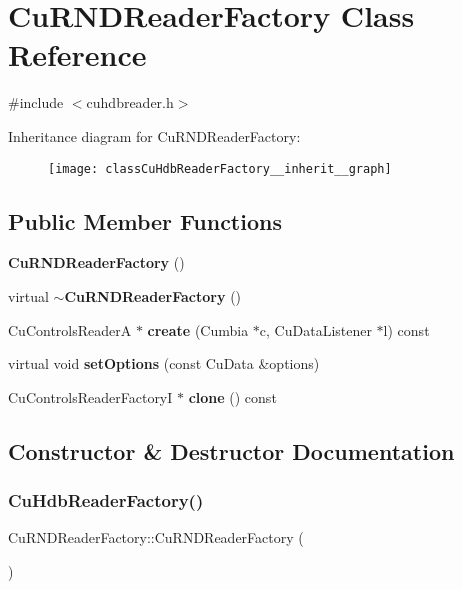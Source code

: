 \section{Cu\+R\+N\+D\+Reader\+Factory Class Reference}
\label{classCuHdbReaderFactory}


{\ttfamily \#include $<$cuhdbreader.\+h$>$}



Inheritance diagram for Cu\+R\+N\+D\+Reader\+Factory\+:
\nopagebreak
\begin{figure}[H]
\begin{center}
\leavevmode
\texttt{[image: classCuHdbReaderFactory\_\_inherit\_\_graph]}
\end{center}
\end{figure}
\subsection*{Public Member Functions}
\begin{DoxyCompactItemize}
\item 
\textbf{ Cu\+R\+N\+D\+Reader\+Factory} ()
\item 
virtual \textbf{ $\sim$\+Cu\+R\+N\+D\+Reader\+Factory} ()
\item 
Cu\+Controls\+ReaderA $\ast$ \textbf{ create} (Cumbia $\ast$c, Cu\+Data\+Listener $\ast$l) const
\item 
virtual void \textbf{ set\+Options} (const Cu\+Data \&options)
\item 
Cu\+Controls\+Reader\+FactoryI $\ast$ \textbf{ clone} () const
\end{DoxyCompactItemize}


\subsection{Constructor \& Destructor Documentation}
\mbox{\label{classCuHdbReaderFactory_aba50f374fd1cefe8d06e48dd94d477f5}} 
\subsubsection{CuHdbReaderFactory()}
{\footnotesize\ttfamily Cu\+R\+N\+D\+Reader\+Factory\+::\+Cu\+R\+N\+D\+Reader\+Factory (\begin{DoxyParamCaption}{ }\end{DoxyParamCaption})}



